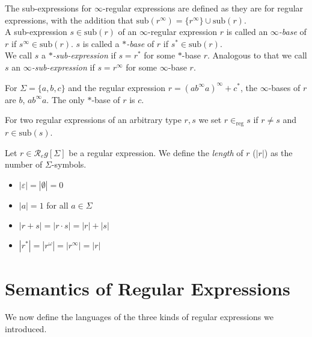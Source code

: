 \begin{defn}
	The sub-expressions for $\infty$-regular expressions are defined as they are for regular expressions, with the addition that $\text{sub}(r^\infty) = \{r^\infty\} \cup \text{sub}(r)$.\\
	A sub-expression $s \in \text{sub}(r)$ of an $\infty$-regular expression $r$ is called an \emph{$\infty$-base} of $r$ if $s^\infty \in \text{sub}(r)$. $s$ is called a \emph{$*$-base} of $r$ if $s^* \in \text{sub}(r)$.\\
	We call $s$ a \emph{$*$-sub-expression} if $s = r^*$ for some $*$-base $r$. Analogous to that we call $s$ an \emph{$\infty$-sub-expression} if $s = r^\infty$ for some $\infty$-base $r$.
\end{defn}

\begin{exmp}
	For $\Sigma = \{a, b, c\}$ and the regular expression $r = (a b^\infty a)^\infty + c^*$, the $\infty$-bases of $r$ are $b$, $a b^\infty a$. The only $*$-base of $r$ is $c$.
\end{exmp}

\begin{defn}
	For two regular expressions of an arbitrary type $r, s$ we set $r \in_\text{reg} s$ if $r \neq s$ and $r \in \text{sub}(s)$.
\end{defn}

\begin{defn}
	Let $r \in \mathcal{R}_eg[\Sigma]$ be a regular expression. We define the \emph{length} of $r$ ($|r|$) as the number of $\Sigma$-symbols.
	\begin{itemize}
		\item $|\varepsilon| = |\emptyset| = 0$
		\item $|a| = 1$ for all $a \in \Sigma$
		\item $|r + s| = |r \cdot s| = |r| + |s|$
		\item $|r^*| = |r^\omega| = |r^\infty| = |r|$
	\end{itemize}
\end{defn}




\section{Semantics of Regular Expressions}
We now define the languages of the three kinds of regular expressions we introduced.


